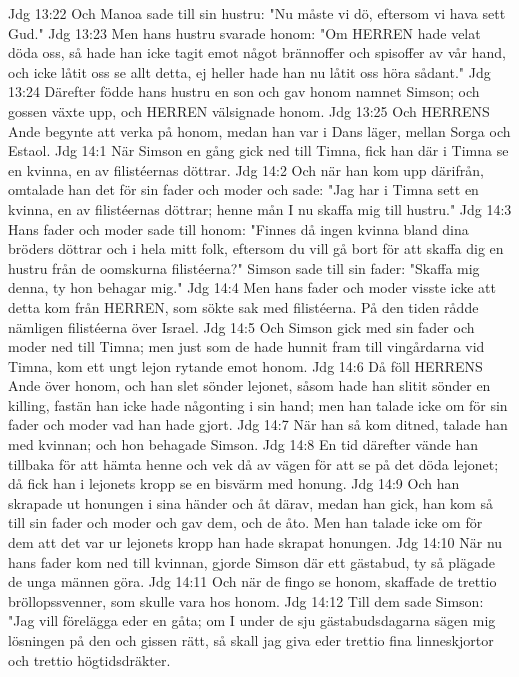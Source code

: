 Jdg 13:22  Och Manoa sade till sin hustru: "Nu måste vi dö, eftersom vi hava sett Gud."
Jdg 13:23  Men hans hustru svarade honom: "Om HERREN hade velat döda oss, så hade han icke tagit emot något brännoffer och spisoffer av vår hand, och icke låtit oss se allt detta, ej heller hade han nu låtit oss höra sådant."
Jdg 13:24  Därefter födde hans hustru en son och gav honom namnet Simson; och gossen växte upp, och HERREN välsignade honom.
Jdg 13:25  Och HERRENS Ande begynte att verka på honom, medan han var i Dans läger, mellan Sorga och Estaol.
Jdg 14:1  När Simson en gång gick ned till Timna, fick han där i Timna se en kvinna, en av filistéernas döttrar.
Jdg 14:2  Och när han kom upp därifrån, omtalade han det för sin fader och moder och sade: "Jag har i Timna sett en kvinna, en av filistéernas döttrar; henne mån I nu skaffa mig till hustru."
Jdg 14:3  Hans fader och moder sade till honom: "Finnes då ingen kvinna bland dina bröders döttrar och i hela mitt folk, eftersom du vill gå bort för att skaffa dig en hustru från de oomskurna filistéerna?" Simson sade till sin fader: "Skaffa mig denna, ty hon behagar mig."
Jdg 14:4  Men hans fader och moder visste icke att detta kom från HERREN, som sökte sak med filistéerna. På den tiden rådde nämligen filistéerna över Israel.
Jdg 14:5  Och Simson gick med sin fader och moder ned till Timna; men just som de hade hunnit fram till vingårdarna vid Timna, kom ett ungt lejon rytande emot honom.
Jdg 14:6  Då föll HERRENS Ande över honom, och han slet sönder lejonet, såsom hade han slitit sönder en killing, fastän han icke hade någonting i sin hand; men han talade icke om för sin fader och moder vad han hade gjort.
Jdg 14:7  När han så kom ditned, talade han med kvinnan; och hon behagade Simson.
Jdg 14:8  En tid därefter vände han tillbaka för att hämta henne och vek då av vägen för att se på det döda lejonet; då fick han i lejonets kropp se en bisvärm med honung.
Jdg 14:9  Och han skrapade ut honungen i sina händer och åt därav, medan han gick, han kom så till sin fader och moder och gav dem, och de åto. Men han talade icke om för dem att det var ur lejonets kropp han hade skrapat honungen.
Jdg 14:10  När nu hans fader kom ned till kvinnan, gjorde Simson där ett gästabud, ty så plägade de unga männen göra.
Jdg 14:11  Och när de fingo se honom, skaffade de trettio bröllopssvenner, som skulle vara hos honom.
Jdg 14:12  Till dem sade Simson: "Jag vill förelägga eder en gåta; om I under de sju gästabudsdagarna sägen mig lösningen på den och gissen rätt, så skall jag giva eder trettio fina linneskjortor och trettio högtidsdräkter.
